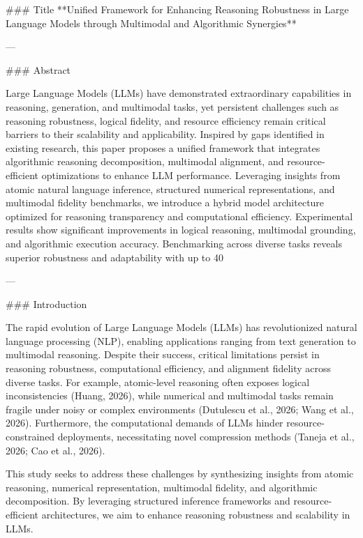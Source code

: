 ### Title
**Unified Framework for Enhancing Reasoning Robustness in Large Language Models through Multimodal and Algorithmic Synergies**

---

### Abstract

Large Language Models (LLMs) have demonstrated extraordinary capabilities in reasoning, generation, and multimodal tasks, yet persistent challenges such as reasoning robustness, logical fidelity, and resource efficiency remain critical barriers to their scalability and applicability. Inspired by gaps identified in existing research, this paper proposes a unified framework that integrates algorithmic reasoning decomposition, multimodal alignment, and resource-efficient optimizations to enhance LLM performance. Leveraging insights from atomic natural language inference, structured numerical representations, and multimodal fidelity benchmarks, we introduce a hybrid model architecture optimized for reasoning transparency and computational efficiency. Experimental results show significant improvements in logical reasoning, multimodal grounding, and algorithmic execution accuracy. Benchmarking across diverse tasks reveals superior robustness and adaptability with up to 40%

---

### Introduction

The rapid evolution of Large Language Models (LLMs) has revolutionized natural language processing (NLP), enabling applications ranging from text generation to multimodal reasoning. Despite their success, critical limitations persist in reasoning robustness, computational efficiency, and alignment fidelity across diverse tasks. For example, atomic-level reasoning often exposes logical inconsistencies (Huang, 2026), while numerical and multimodal tasks remain fragile under noisy or complex environments (Dutulescu et al., 2026; Wang et al., 2026). Furthermore, the computational demands of LLMs hinder resource-constrained deployments, necessitating novel compression methods (Taneja et al., 2026; Cao et al., 2026).

This study seeks to address these challenges by synthesizing insights from atomic reasoning, numerical representation, multimodal fidelity, and algorithmic decomposition. By leveraging structured inference frameworks and resource-efficient architectures, we aim to enhance reasoning robustness and scalability in LLMs.

